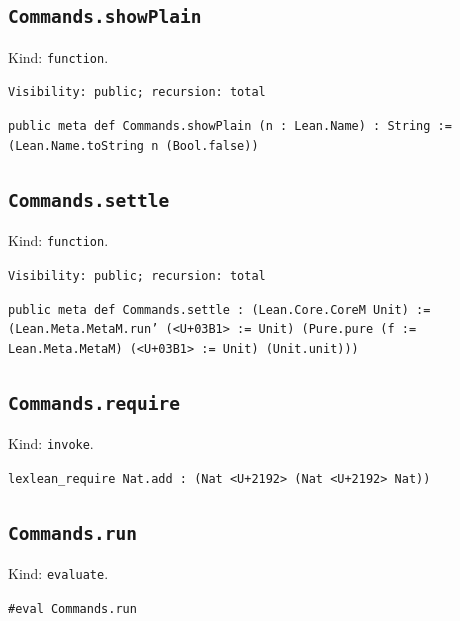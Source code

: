 \documentclass[11pt]{article}
\begin{document}
\subsection*{\texttt{Commands.showPlain}}
\noindent Kind: \texttt{function}.\par
\noindent \texttt{Visibility: public; recursion: total}\par
\noindent \texttt{public meta def Commands.showPlain (n : Lean.Name) : String :=   (Lean.Name.toString n (Bool.false))}\par
\subsection*{\texttt{Commands.settle}}
\noindent Kind: \texttt{function}.\par
\noindent \texttt{Visibility: public; recursion: total}\par
\noindent \texttt{public meta def Commands.settle : (Lean.Core.CoreM Unit) :=   (Lean.Meta.MetaM.run' (<U+03B1> := Unit) (Pure.pure (f := Lean.Meta.MetaM) (<U+03B1> := Unit) (Unit.unit)))}\par
\subsection*{\texttt{Commands.require}}
\noindent Kind: \texttt{invoke}.\par
\noindent \texttt{lexlean\_require Nat.add : (Nat <U+2192> (Nat <U+2192> Nat))}\par
\subsection*{\texttt{Commands.run}}
\noindent Kind: \texttt{evaluate}.\par
\noindent \texttt{\#eval Commands.run}\par
\end{document}
